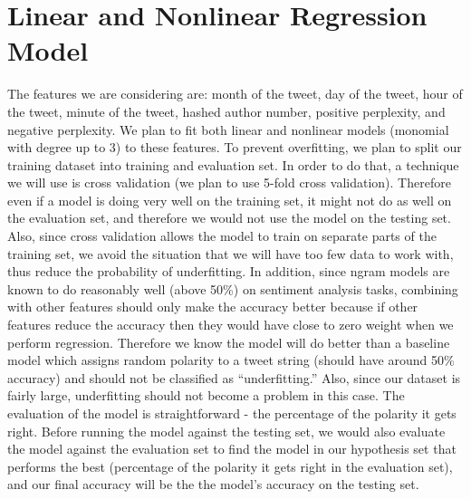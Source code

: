 \documentclass[a4paper]{article}
\begin{document}
\section{Linear and Nonlinear Regression Model}
\begin{flushleft}
The features we are considering are: month of the tweet, day of the tweet, hour of the tweet, minute of the tweet, hashed author number, positive perplexity, and negative perplexity. We plan to fit both linear and nonlinear models (monomial with degree up to 3) to these features. To prevent overfitting, we plan to split our training dataset into training and evaluation set. In order to do that, a technique we will use is cross validation (we plan to use 5-fold cross validation). Therefore even if a model is doing very well on the training set, it might not do as well on the evaluation set, and therefore we would not use the model on the testing set. Also, since cross validation allows the model to train on separate parts of the training set, we avoid the situation that we will have too few data to work with, thus reduce the probability of underfitting. In addition, since ngram models are known to do reasonably well (above 50\%) on sentiment analysis tasks, combining with other features should only make the accuracy better because if other features reduce the accuracy then they would have close to zero weight when we perform regression. Therefore we know the model will do better than a baseline model which assigns random polarity to a tweet string (should have around 50\% accuracy) and should not be classified as “underfitting.” Also, since our dataset is fairly large, underfitting should not become a problem in this case. The evaluation of the model is straightforward - the percentage of the polarity it gets right. Before running the model against the testing set, we would also evaluate the model against the evaluation set to find the model in our hypothesis set that performs the best (percentage of the polarity it gets right in the evaluation set), and our final accuracy will be the the model’s accuracy on the testing set.
\end{flushleft}
\end{document}
